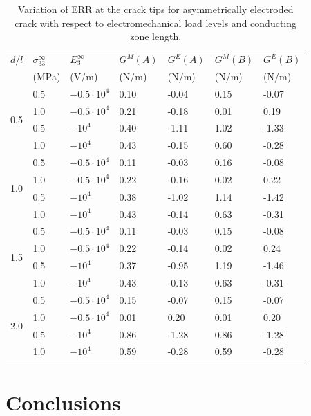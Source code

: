 \begin{table}[t]
	\centering
	\caption{Variation of ERR at the crack tips for asymmetrically electroded crack with respect to electromechanical load levels and conducting zone length.}
	\label{AdluckyTab2}
	\begin{tabular}{p{3em}p{4em}p{6em}p{5em}p{5em}p{5em}p{5em}}
		\toprule
		$d/l$ & $\sigma_{33}^{\infty}$ & $E_{3}^{\infty}$ & $G^M(A)$ & $G^E(A)$ & $G^M(B)$ & $G^E(B)$ \\
		& (MPa)                  & (V/m)            & (N/m)    & (N/m)    & (N/m)    & (N/m)    \\
		\midrule
		\multirow{4}{*}{0.5}
		& 0.5 & $-0.5 \cdot 10^4$ & 0.10 & -0.04 & 0.15 & -0.07 \\
		& 1.0 & $-0.5 \cdot 10^4$ & 0.21 & -0.18 & 0.01 &  0.19 \\
		& 0.5 & $-10^4$           & 0.40 & -1.11 & 1.02 & -1.33 \\
		& 1.0 & $-10^4$           & 0.43 & -0.15 & 0.60 & -0.28 \\
		\midrule
		\multirow{4}{*}{1.0}
		& 0.5 & $-0.5 \cdot 10^4$ & 0.11 & -0.03 & 0.16 & -0.08 \\
		& 1.0 & $-0.5 \cdot 10^4$ & 0.22 & -0.16 & 0.02 &  0.22 \\
		& 0.5 & $-10^4$           & 0.38 & -1.02 & 1.14 & -1.42 \\
		& 1.0 & $-10^4$           & 0.43 & -0.14 & 0.63 & -0.31 \\
		\midrule
		\multirow{4}{*}{1.5}
		& 0.5 & $-0.5 \cdot 10^4$ & 0.11 & -0.03 & 0.15 & -0.08 \\
		& 1.0 & $-0.5 \cdot 10^4$ & 0.22 & -0.14 & 0.02 &  0.24 \\
		& 0.5 & $-10^4$           & 0.37 & -0.95 & 1.19 & -1.46 \\
		& 1.0 & $-10^4$           & 0.43 & -0.13 & 0.63 & -0.31 \\
		\midrule
		\multirow{4}{*}{2.0}
		& 0.5 & $-0.5 \cdot 10^4$ & 0.15 & -0.07 & 0.15 & -0.07 \\
		& 1.0 & $-0.5 \cdot 10^4$ & 0.01 &  0.20 & 0.01 &  0.20 \\
		& 0.5 & $-10^4$           & 0.86 & -1.28 & 0.86 & -1.28 \\
		& 1.0 & $-10^4$           & 0.59 & -0.28 & 0.59 & -0.28 \\
		\bottomrule
	\end{tabular}
\end{table}

\section{Conclusions}

